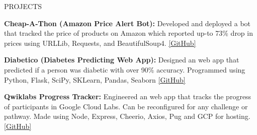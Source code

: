 \documentclass{resume} %
\begin{document}

\begin{rSection}{PROJECTS}
\vspace{-1.25em}

\item \textbf{Cheap-A-Thon (Amazon Price Alert Bot):} {Developed and deployed a bot that tracked the price of products on Amazon which reported up-to 73\% drop in prices using URLLib, Requests, and BeautifulSoup4.}
\href{https://github.com/Sabyasachi-Seal/AmazonPriceDropAlert}{[GitHub]}

\item \textbf{Diabetico (Diabetes Predicting Web App):} {Designed an web app that predicted if a person was diabetic with over 90\% accuracy. Programmed using Python, Flask, SciPy, SKLearn, Pandas, Seaborn}
\href{https://github.com/Sabyasachi-Seal/DiabetesPredictor}{[GitHub]}

\item \textbf{Qwiklabs Progress Tracker:} {Engineered an web app that tracks the progress of participants in Google Cloud Labs. Can be reconfigured for any challenge or pathway. Made using Node, Express, Cheerio, Axios, Pug and GCP for hosting.} \href{https://github.com/Sabyasachi-Seal/QwiklabsProgressTracker}{[GitHub]}
\end{rSection} 
\end{document}
